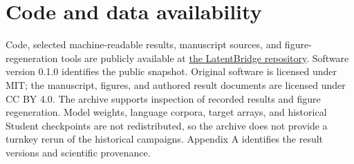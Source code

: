 \section*{Code and data availability}\label{code-and-data-availability}

Code, selected machine-readable results, manuscript sources, and figure-regeneration tools are publicly available at \href{https://github.com/P1g0d/latentbridge-synthetic-support}{the LatentBridge repository}. Software version 0.1.0 identifies the public snapshot. Original software is licensed under MIT; the manuscript, figures, and authored result documents are licensed under CC BY 4.0. The archive supports inspection of recorded results and figure regeneration. Model weights, language corpora, target arrays, and historical Student checkpoints are not redistributed, so the archive does not provide a turnkey rerun of the historical campaigns. Appendix A identifies the result versions and scientific provenance.
